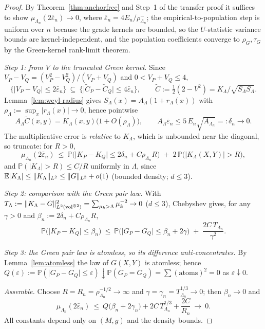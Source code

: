 \begin{proof}
By Theorem~\ref{thm:anchorfree} and Step~1 of the transfer proof it suffices to
show $\mu_{\Lambda_n}(2\bar\varepsilon_n)\to0$, where
$\bar\varepsilon_n=4E_n/\rho^-_{\Lambda_n}$; the empirical-to-population step is
uniform over $n$ because the grade kernels are bounded, so the $U$-statistic
variance bounds are kernel-independent, and the population coefficients converge
to $\rho_G,\tau_G$ by the Green-kernel rank-limit theorem.

\emph{Step 1: from $V$ to the truncated Green kernel.}  Since
$V_P-V_Q=(V_P^2-V_Q^2)/(V_P+V_Q)$ and $0<V_P+V_Q\le4$,
\[
\{\lvert V_P-V_Q\rvert\le2\bar\varepsilon_n\}\ \subseteq\
\{\lvert \widetilde C_P-\widetilde C_Q\rvert\le4\bar\varepsilon_n\},
\qquad \widetilde C:=\tfrac12(2-V^2)=K_\Lambda/\sqrt{S_\Lambda S_\Lambda}.
\]
Lemma~\ref{lem:weyl-radius} gives $S_\Lambda(x)=A_\Lambda(1+r_\Lambda(x))$
with $\rho_\Lambda:=\sup_x\lvert r_\Lambda(x)\rvert\to0$, hence pointwise
\[
A_\Lambda\widetilde C(x,y)=K_\Lambda(x,y)\bigl(1+O(\rho_\Lambda)\bigr),
\qquad
A_\Lambda\bar\varepsilon_n\le 5\,E_n\sqrt{A_{\Lambda_n}}=:\delta_n\to0 .
\]
The multiplicative error is \emph{relative} to $K_\Lambda$, which is unbounded
near the diagonal, so truncate: for $R>0$,
\[
\mu_{\Lambda_n}(2\bar\varepsilon_n)\ \le\
\mathbb P\bigl(\lvert K_P-K_Q\rvert\le 2\delta_n+C\rho_{\Lambda_n}R\bigr)
\;+\;2\,\mathbb P\bigl(\lvert K_\Lambda(X,Y)\rvert>R\bigr),
\]
and $\mathbb P(\lvert K_\Lambda\rvert>R)\le C/R$ uniformly in $\Lambda$, since
$\mathbb E\lvert K_\Lambda\rvert\le\lVert K_\Lambda\rVert_{L^2}\le
\lVert G\rVert_{L^2}+o(1)$ (bounded density; $d\le3$).

\emph{Step 2: comparison with the Green pair law.}  With
$T_\Lambda:=\lVert K_\Lambda-G\rVert_{L^2(\operatorname{vol}^{\otimes2})}^2
=\sum_{\mu_k>\Lambda}\mu_k^{-2}\to0$ ($d\le3$), Chebyshev gives, for any
$\gamma>0$ and $\beta_n:=2\delta_n+C\rho_{\Lambda_n}R$,
\[
\mathbb P\bigl(\lvert K_P-K_Q\rvert\le\beta_n\bigr)\ \le\
\mathbb P\bigl(\lvert G_P-G_Q\rvert\le\beta_n+2\gamma\bigr)
\;+\;\frac{2C\,T_{\Lambda_n}}{\gamma^2}.
\]

\emph{Step 3: the Green pair law is atomless, so its difference
anti-concentrates.}  By Lemma~\ref{lem:atomless} the law of $G(X,Y)$ is
atomless; hence $Q(\varepsilon):=\mathbb P(\lvert G_P-G_Q\rvert\le\varepsilon)
\downarrow\mathbb P(G_P=G_Q)=\sum(\text{atoms})^2=0$ as $\varepsilon\downarrow0$.

\emph{Assemble.}  Choose $R=R_n=\rho_{\Lambda_n}^{-1/2}\to\infty$ and
$\gamma=\gamma_n=T_{\Lambda_n}^{1/3}\to0$; then $\beta_n\to0$ and
\[
\mu_{\Lambda_n}(2\bar\varepsilon_n)\ \le\
Q\bigl(\beta_n+2\gamma_n\bigr)+2C\,T_{\Lambda_n}^{1/3}+\frac{2C}{R_n}
\ \longrightarrow\ 0 .
\]
All constants depend only on $(M,g)$ and the density bounds.
\end{proof}

